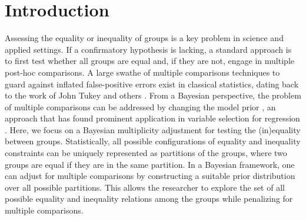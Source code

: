 \documentclass[11pt,a4paper]{article}
\theoremstyle{definition} %
\theoremstyle{case}
\begin{document}
\section{Introduction}
Assessing the equality or inequality of groups is a key problem in science and applied settings. If a confirmatory hypothesis is lacking, a standard approach is to first test whether all groups are equal and, if they are not, engage in multiple post-hoc comparisons. A large swathe of multiple comparisons techniques to guard against inflated false-positive errors exist in classical statistics, dating back to the work of John Tukey and others \parencite[e.g.,][]{rao2009multiple, benjamini2002john}. From a Bayesian perspective, the problem of multiple comparisons can be addressed by changing the model prior \parencite[e.g.,][]{jeffreys1961theory, westfall1997bayesian, berry1999bayesian, debayesian2019}, an approach that has found prominent application in variable selection for regression \parencite[e.g.,][]{scott2006exploration, scott2010bayes}. Here, we focus on a Bayesian multiplicity adjustment for testing the (in)equality between groups. Statistically, all possible configurations of equality and inequality constraints can be uniquely represented as partitions of the groups, where two groups are equal if they are in the same partition. In a Bayesian framework, one can adjust for multiple comparisons by constructing a suitable prior distribution over all possible partitions. This allows the researcher to explore the set of all possible equality and inequality relations among the groups while penalizing for multiple comparisons.
\end{document}

